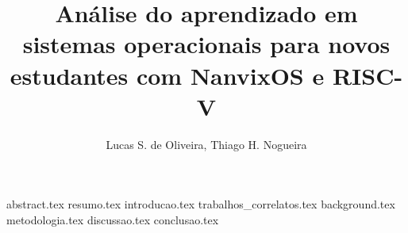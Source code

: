 \documentclass[12pt]{article}
\title{Análise do aprendizado em sistemas operacionais para novos estudantes com NanvixOS e RISC-V
}
\author{Lucas S. de Oliveira\inst{1}, Thiago H. Nogueira\inst{1}}
\begin{document}
    \maketitle

    {abstract.tex}
    {resumo.tex}
    {introducao.tex}
    {trabalhos_correlatos.tex}
    {background.tex}
    {metodologia.tex}
    {discussao.tex}
    {conclusao.tex}
    
    
    
\end{document}
